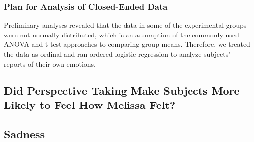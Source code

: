 \documentclass[man,a4paper,noextraspace,apacite]{apa6}
\begin{document}
\subsubsection{Plan for Analysis of Closed-Ended Data} Preliminary analyses revealed that the data in some of the experimental groups were not normally distributed, which is an assumption of the commonly used ANOVA and t test approaches to comparing group means. Therefore, we treated the data as ordinal and ran ordered logistic regression to analyze subjects' reports of their own emotions.


\subsection{Did Perspective Taking Make Subjects More Likely to Feel How Melissa Felt?}

\subsection{Sadness} 
\end{document}
